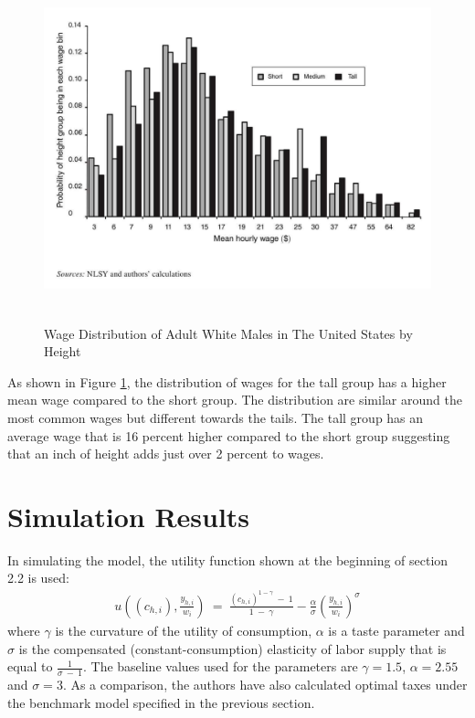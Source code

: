 \documentclass[titlepage]{\econtex}
\begin{document}
\begin{figure}[H]
  \centering
  \includegraphics[width=1\textwidth, height=10cm]{WageDistributionGraph.JPG}
  \caption{Wage Distribution of Adult White Males in The United States by Height}
    \label{fig:Figure 1}
  \end{figure}

  As shown in Figure \ref{fig:Figure 1}, the distribution of wages for the tall group has a higher mean wage compared to the short group. The distribution are similar around the most common wages but different towards the tails. The tall group has an average wage that is 16 percent higher compared to the short group suggesting that an inch of height adds just over 2 percent to wages.

\hypertarget{Simulation Results}{}
\section{Simulation Results}

In simulating the model, the utility function shown at the beginning of section 2.2 is used:
   \begin{align}
  u\left((c_{h,i}), \frac{y_{h,i}}{w_i}\right) \ = \ \frac{(c_{h,i})^{1-\gamma} \ - \ 1}{1 \ - \ \gamma} - \frac{\alpha}{\sigma} \left(\frac{y_{h,i}}{w_i}\right)^\sigma
   \end{align}
   where $\gamma$ is the curvature of the utility of consumption, $\alpha$ is a taste parameter and $\sigma$ is the compensated (constant-consumption) elasticity of labor supply that is equal to $\frac{1}{\sigma \ - \ 1}$. The baseline values used for the parameters are $\gamma = 1.5$, $\alpha = 2.55$ and $ \sigma = 3$. As a comparison, the authors have also calculated optimal taxes under the benchmark model specified in the previous section.
\end{document}
